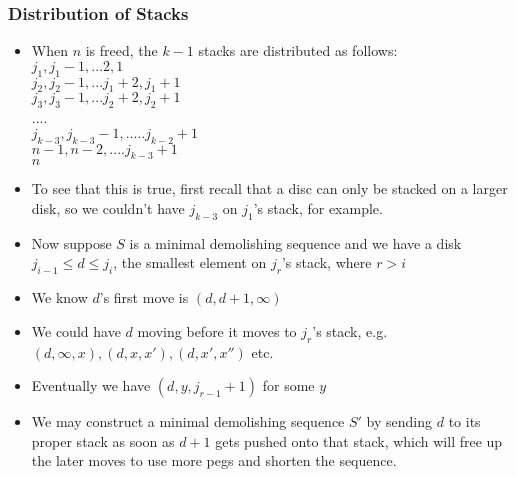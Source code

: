 \documentclass{article}
\begin{document}
\subsubsection{Distribution of Stacks}
\begin{itemize}
\item When $n$ is freed, the $k-1$ stacks are distributed as follows:
\\$j_1,j_1-1,...2,1$
\\$j_2,j_2-1,...j_1+2,j_1+1$
\\$j_3,j_3-1,...j_2+2,j_2+1$
\\....
\\$j_{k-3},j_{k-3}-1,.....j_{k-2}+1$
\\$n-1,n-2,....j_{k-3}+1$
\\$n$
\item To see that this is true, first recall that a disc can only be stacked on a larger disk, so we couldn't have $j_{k-3}$ on $j_1$'s stack, for example.
\item Now suppose $S$ is a minimal demolishing sequence and we have a disk $j_{i-1} \leq d \leq j_i$, the smallest element
on $j_{r}$'s stack, where $r>i$
\item We know $d$'s first move is $(d,d+1,\infty)$
\item We could have $d$ moving before it moves to $j_{r}$'s stack, e.g. $(d,\infty,x),(d,x,x'),(d,x',x'')$ etc.
\item Eventually we have $(d,y,j_{r-1}+1)$ for some $y$
\item We may construct a minimal demolishing sequence $S'$ by sending $d$ to its proper stack as soon as $d+1$ gets pushed onto that         stack, which will free up the later moves to use more pegs and shorten the sequence.
\end{itemize}
\end{document}
